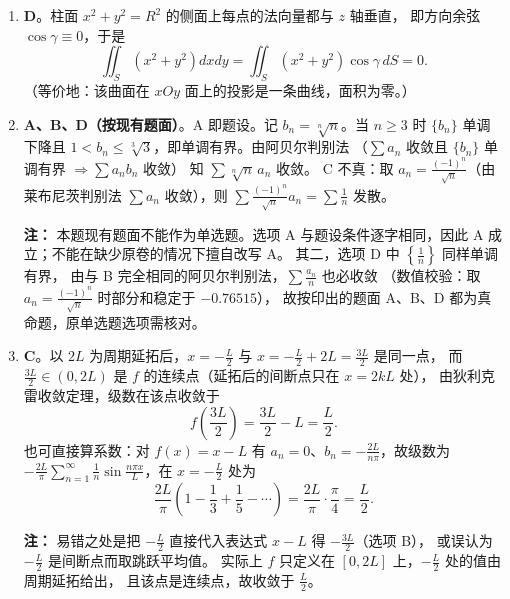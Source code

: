 \begin{enumerate}
{\begin{enumerate}
	\item
	\textbf{D}。柱面 $x^{2}+y^{2}=R^{2}$ 的侧面上每点的法向量都与 $z$ 轴垂直，
	即方向余弦 $\cos\gamma\equiv0$，于是
	\[
	\iint_{S}\left(x^{2}+y^{2}\right)dxdy=\iint_{S}\left(x^{2}+y^{2}\right)\cos\gamma\,dS=0 .
	\]
	（等价地：该曲面在 $xOy$ 面上的投影是一条曲线，面积为零。）

	\item
	\textbf{A、B、D（按现有题面）}。A 即题设。记 $b_{n}=\sqrt[n]{n}$。当 $n\geqslant3$ 时 $\{b_{n}\}$ 单调下降且
	$1<b_{n}\leqslant\sqrt[3]{3}$，即单调有界。由阿贝尔判别法
	（$\sum a_{n}$ 收敛且 $\{b_{n}\}$ 单调有界 $\Longrightarrow\sum a_{n}b_{n}$ 收敛）
	知 $\sum\sqrt[n]{n}\,a_{n}$ 收敛。
	C 不真：取 $a_{n}=\frac{(-1)^{n}}{\sqrt n}$（由莱布尼茨判别法 $\sum a_{n}$ 收敛），则
	$\sum\frac{(-1)^{n}}{\sqrt n}a_{n}=\sum\frac1n$ 发散。

	\par\vspace{1mm}\noindent
	\textbf{注：}{\kaishu
	本题现有题面不能作为单选题。选项 A 与题设条件逐字相同，因此 A 成立；不能在缺少原卷的情况下擅自改写 A。
	其二，选项 D 中 $\left\{\frac1n\right\}$ 同样单调有界，
	由与 B 完全相同的阿贝尔判别法，$\sum\frac{a_{n}}{n}$ 也必收敛
	（数值校验：取 $a_{n}=\frac{(-1)^{n}}{\sqrt n}$ 时部分和稳定于 $-0.76515$），
	故按印出的题面 A、B、D 都为真命题，原单选题选项需核对。
	}\par

	\item
	\textbf{C}。以 $2L$ 为周期延拓后，$x=-\frac L2$ 与 $x=-\frac L2+2L=\frac{3L}{2}$ 是同一点，
	而 $\frac{3L}{2}\in(0,2L)$ 是 $f$ 的连续点（延拓后的间断点只在 $x=2kL$ 处），
	由狄利克雷收敛定理，级数在该点收敛于
	\[
	f\!\left(\frac{3L}{2}\right)=\frac{3L}{2}-L=\frac{L}{2} .
	\]
	也可直接算系数：对 $f(x)=x-L$ 有 $a_{n}=0$、$b_{n}=-\frac{2L}{n\pi}$，故级数为
	$-\frac{2L}{\pi}\sum\limits_{n=1}^{\infty}\frac{1}{n}\sin\frac{n\pi x}{L}$，在 $x=-\frac L2$ 处为
	\[
	\frac{2L}{\pi}\left(1-\frac13+\frac15-\cdots\right)=\frac{2L}{\pi}\cdot\frac{\pi}{4}=\frac{L}{2} .
	\]

	\par\vspace{1mm}\noindent
	\textbf{注：}{\kaishu
	易错之处是把 $-\frac L2$ 直接代入表达式 $x-L$ 得 $-\frac{3L}{2}$（选项 B），
	或误认为 $-\frac L2$ 是间断点而取跳跃平均值。
	实际上 $f$ 只定义在 $[0,2L]$ 上，$-\frac L2$ 处的值由周期延拓给出，
	且该点是连续点，故收敛于 $\frac L2$。
	}\par
\end{enumerate}
}


\end{enumerate}
